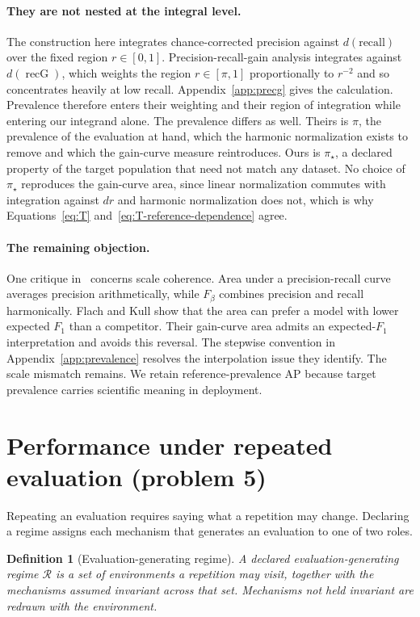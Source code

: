 \documentclass[11pt]{article}
\newcommand{\Regime}{\mathcal{R}}
\newtheorem{definition}{Definition}
\theoremstyle{remark}
\begin{document}
\paragraph{They are not nested at the integral level.}
The construction here integrates chance-corrected precision against $d(\text{recall})$ over the fixed region $r\in[0,1]$. Precision-recall-gain analysis integrates against $d(\operatorname{recG})$, which weights the region $r\in[\pi,1]$ proportionally to $r^{-2}$ and so concentrates heavily at low recall. Appendix~\ref{app:precg} gives the calculation. Prevalence therefore enters their weighting and their region of integration while entering our integrand alone. The prevalence differs as well. Theirs is $\pi$, the prevalence of the evaluation at hand, which the harmonic normalization exists to remove and which the gain-curve measure reintroduces. Ours is $\pi_\star$, a declared property of the target population that need not match any dataset. No choice of $\pi_\star$ reproduces the gain-curve area, since linear normalization commutes with integration against $dr$ and harmonic normalization does not, which is why Equations~\eqref{eq:T} and~\eqref{eq:T-reference-dependence} agree.
\paragraph{The remaining objection.}
One critique in~\cite{flach2015prg} concerns scale coherence. Area under a precision-recall curve averages precision arithmetically, while $F_\beta$ combines precision and recall harmonically. Flach and Kull show that the area can prefer a model with lower expected $F_1$ than a competitor. Their gain-curve area admits an expected-$F_1$ interpretation and avoids this reversal. The stepwise convention in Appendix~\ref{app:prevalence} resolves the interpolation issue they identify. The scale mismatch remains. We retain reference-prevalence AP because target prevalence carries scientific meaning in deployment.

\section{Performance under repeated evaluation (problem 5)}
\label{sec:regime}

Repeating an evaluation requires saying what a repetition may change. Declaring a regime assigns each mechanism that generates an evaluation to one of two roles.

\begin{definition}[Evaluation-generating regime]
A declared evaluation-generating regime $\Regime$ is a set of environments a repetition may visit, together with the mechanisms assumed invariant across that set. Mechanisms not held invariant are redrawn with the environment.
\end{definition}
\end{document}
